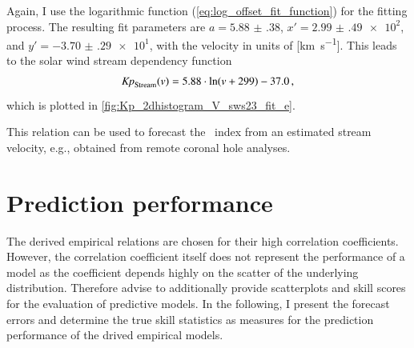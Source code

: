 Again, I use the logarithmic function (\ref{eq:log_offset_fit_function}) for the fitting process. The resulting fit parameters are $a = \num{5.88(38)}$, $x' = \num{2.99(49)e2}$, and $y' = \num{-3.70(29)e1}$, with the velocity in units of [\si{\km\per\s}].
This leads to the solar wind stream dependency function
\begin{align}
	\text{\textit{Kp}}_\text{Stream}(v) = 5.88 \cdot \ln(v + 299) - 37.0	\,,	\label{eq:kpvsv_stream_dependency_function}
\end{align}
which is plotted in \autoref{fig:Kp_2dhistogram_V_sws23_fit_e}.
\begin{figure}
\end{figure}

This relation can be used to forecast the \Kp{}~index from an estimated stream velocity, e.g., obtained from remote coronal hole analyses.


\section{Prediction performance}
\label{sec:prediction_performance}
The derived empirical relations are chosen for their high correlation coefficients. However, the correlation coefficient itself does not represent the performance of a model as the coefficient depends highly on the scatter of the underlying distribution. Therefore \citet{Wing2005} advise to additionally provide scatterplots and skill scores for the evaluation of predictive models. In the following, I present the forecast errors and determine the true skill statistics as measures for the prediction performance of the drived empirical models.

